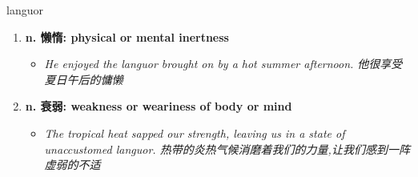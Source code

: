 
\begin{frame}
{\huge languor}
\begin{center}
\begin{enumerate}\Large
  \item \textbf{n. 懒惰: physical or mental inertness}
  \begin{itemize}
    \item \em{\Large{He enjoyed the languor brought on by a hot summer afternoon. 他很享受夏日午后的慵懒}}
  \end{itemize}
  \item \textbf{n. 衰弱: weakness or weariness of body or mind}
  \begin{itemize}
    \item \em{\Large{The tropical heat sapped our strength, leaving us in a state of unaccustomed languor. 热带的炎热气候消磨着我们的力量,让我们感到一阵虚弱的不适}}
  \end{itemize}
\end{enumerate}
\end{center}
\end{frame}

